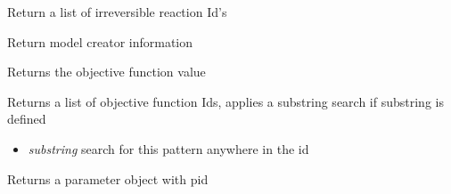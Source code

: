\documentclass[a4paper,11pt,english]{sphinxmanual}
\begin{document}
\begin{fulllineitems}
\begin{fulllineitems}
\end{fulllineitems}


\begin{fulllineitems}
\label{modules_doc:cbmpy.CBModel.Model.getIrreversibleReactionIds}
Return a list of irreversible reaction Id's

\end{fulllineitems}


\begin{fulllineitems}
\label{modules_doc:cbmpy.CBModel.Model.getModelCreators}
Return model creator information

\end{fulllineitems}


\begin{fulllineitems}
\label{modules_doc:cbmpy.CBModel.Model.getObjFuncValue}
Returns the objective function value

\end{fulllineitems}


\begin{fulllineitems}
\label{modules_doc:cbmpy.CBModel.Model.getObjectiveIds}
Returns a list of objective function Ids, applies a substring search if substring is defined
\begin{itemize}
\item {} 
\emph{substring} search for this pattern anywhere in the id

\end{itemize}

\end{fulllineitems}


\begin{fulllineitems}
\label{modules_doc:cbmpy.CBModel.Model.getParameter}
Returns a parameter object with pid


\end{fulllineitems}
\end{fulllineitems}
\end{document}
